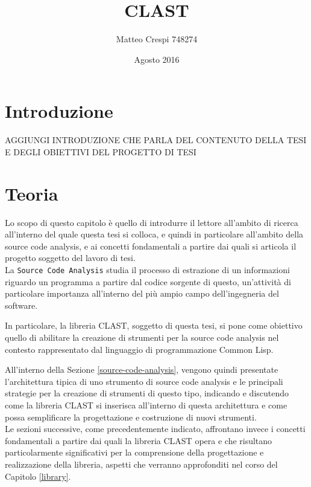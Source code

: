 \documentclass{book}
\title{CLAST}
\author{Matteo Crespi 748274}
\date{Agosto 2016}
\begin{document}
\maketitle

\newpage

\tableofcontents
\listoffigures
\lstlistoflistings

\cleardoublepage

\chapter{Introduzione}

AGGIUNGI INTRODUZIONE CHE PARLA DEL CONTENUTO DELLA TESI E DEGLI OBIETTIVI DEL
PROGETTO DI TESI



\begingroup
\let\clearpage\relax

\chapter{Teoria}

Lo scopo di questo capitolo è quello di introdurre il lettore all’ambito di
ricerca all’interno del quale questa tesi si colloca, e quindi in particolare
all’ambito della source code analysis, e ai concetti fondamentali a partire dai
quali si articola il progetto soggetto del lavoro di tesi.\\

La \texttt{Source Code Analysis} studia il processo di estrazione di un
informazioni riguardo un programma a partire dal codice sorgente di questo,
un’attività di particolare importanza all'interno del più ampio campo
dell'ingegneria del software.

In particolare, la libreria CLAST, soggetto di questa tesi, si pone come
obiettivo quello di abilitare la creazione di strumenti per la source code
analysis nel contesto rappresentato dal linguaggio di programmazione Common
Lisp.

All'interno della Sezione \ref{source-code-analysis}, vengono quindi presentate
l'architettura tipica di uno strumento di source code analysis e le principali
strategie per la creazione di strumenti di questo tipo, indicando e discutendo
come la libreria CLAST si inserisca all'interno di questa architettura e come
possa semplificare la progettazione e costruzione di nuovi strumenti.\\

Le sezioni successive, come precedentemente indicato, affrontano invece i
concetti fondamentali a partire dai quali la libreria CLAST opera e che
risultano particolarmente significativi per la comprensione della progettazione
e realizzazione della libreria, aspetti che verranno approfonditi nel corso del
Capitolo \ref{library}.
\end{document}
